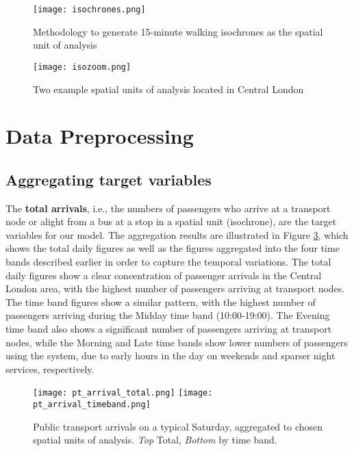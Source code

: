 \begin{figure}[ht]
    \centering
    \texttt{[image: isochrones.png]}
    \captionsetup{justification=centering}
    \caption{Methodology to generate 15-minute walking isochrones as the spatial unit of analysis}
    \label{fig:isochrones}
\end{figure}

\begin{figure}[!ht]
    \centering
    \texttt{[image: isozoom.png]}
    \caption{Two example spatial units of analysis located in Central London}
    \label{fig:isozoom}
\end{figure}




\pagebreak[4] %
\section{Data Preprocessing}
\subsection{Aggregating target variables}

The \textbf{total arrivals}, i.e., the numbers of passengers who arrive at a transport node or alight from a bus at a stop in a spatial unit (isochrone), are the target variables for our model. The aggregation results are illustrated in Figure \ref{fig:ptarrival}, which shows the total daily figures as well as the figures aggregated into the four time bands described earlier in order to capture the temporal variations. The total daily figures show a clear concentration of passenger arrivals in the Central London area, with the highest number of passengers arriving at transport nodes. The time band figures show a similar pattern, with the highest number of passengers arriving during the Midday time band (10:00-19:00). The Evening time band also shows a significant number of passengers arriving at transport nodes, while the Morning and Late time bands show lower numbers of passengers using the system, due to early hours in the day on weekends and sparser night services, respectively. 

\begin{figure}[!b]
    \centering
    \texttt{[image: pt\_arrival\_total.png]}
    \centering
    \texttt{[image: pt\_arrival\_timeband.png]}
    \captionsetup{justification=centering}
    \caption{Public transport arrivals on a typical Saturday, aggregated to chosen spatial units of analysis. \textit{Top} Total, \textit{Bottom} by time band.}
    \label{fig:ptarrival}
\end{figure}

